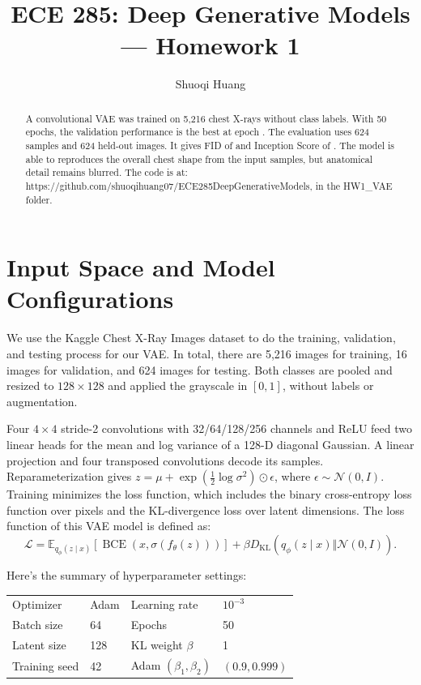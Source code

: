 \documentclass{article}
\title{ECE 285: Deep Generative Models --- Homework 1}
\author{Shuoqi Huang}
\begin{document}
\maketitle
\thispagestyle{plain}
\begin{abstract}
A convolutional VAE was trained on 5,216 chest X-rays without class labels. With 50 epochs, the validation performance is the best at epoch \SelectedEpoch{}. The evaluation uses 624 samples and 624 held-out images. It gives FID of \FIDvalue{} and Inception
Score of \ISvalue{}. The model is able to reproduces the overall chest shape from the input samples, but anatomical detail remains blurred. The code is at: https://github.com/shuoqihuang07/ECE285DeepGenerativeModels, in the HW1\_VAE folder.
\end{abstract}

\section{Input Space and Model Configurations}
We use the Kaggle Chest X-Ray Images dataset to do the training, validation, and testing process for our VAE. In total, there are 5,216 images for training, 16 images for validation, and 624 images for testing. Both classes
are pooled and resized to $128\times128$ and applied the grayscale in $[0,1]$, without labels
or augmentation.

Four $4\times4$ stride-2 convolutions with 32/64/128/256 channels and ReLU
feed two linear heads for the mean and log variance of a 128-D diagonal
Gaussian. A linear projection and four transposed convolutions decode its
samples. Reparameterization gives
$z=\mu+\exp(\tfrac12\log\sigma^2)\odot\epsilon$, where
$\epsilon\sim\mathcal N(0,I)$. Training minimizes the loss function, which includes the binary cross-entropy loss function over pixels and the KL-divergence loss over latent dimensions. The loss function of this VAE model is defined as:
\begin{equation}
\mathcal L=\mathbb E_{q_\phi(z\mid x)}[\operatorname{BCE}(x,\sigma(f_\theta(z)))]
+\beta D_{\mathrm{KL}}(q_\phi(z\mid x)\Vert\mathcal N(0,I)).
\end{equation}

Here's the summary of hyperparameter settings:

\begin{center}
\small
\begin{tabular}{ll@{\qquad}ll}
\toprule
Optimizer & Adam & Learning rate & $10^{-3}$\\
Batch size & 64 & Epochs & 50\\
Latent size & 128 & KL weight $\beta$ & 1\\
Training seed & 42 & Adam $(\beta_1,\beta_2)$ & $(0.9,0.999)$\\
\bottomrule
\end{tabular}
\end{center}
\end{document}

